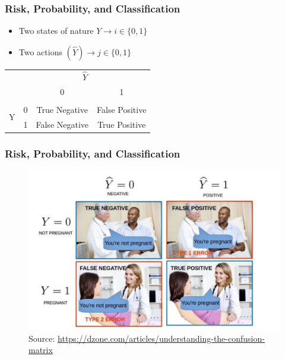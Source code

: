 \documentclass[
  shownotes,
  xcolor={svgnames},
  hyperref={colorlinks,citecolor=DarkBlue,linkcolor=andesred,urlcolor=DarkBlue}
  , aspectratio=169]{beamer}
\begin{document}
\begin{frame}[fragile]
\frametitle{Risk, Probability, and Classification}

\begin{itemize}
  \item Two states of nature $Y \rightarrow i\in\{0,1\}$
  \medskip
  \item Two actions $(\hat{Y}) \rightarrow j\in \{0,1\}$
\end{itemize}

\begin{table}[H]
\centering
\begin{tabular}{cc|cc}
& \multicolumn{3}{c}{$\hat{Y}$}\tabularnewline
&  & 0 & 1 \\[5pt]
\hline\\[5pt]
\multirow{2}{*}{Y} & 0 & True Negative & False Positive \\[10pt]
& 1 & False Negative & True Positive \\
\end{tabular}
\end{table}
\end{frame}
\begin{frame}[fragile]
\frametitle{Risk, Probability, and Classification}

        \begin{figure}[H] \centering
            \captionsetup{justification=centering}
              \includegraphics[scale=0.4]{figures/confusion_matrix}
              \\
              \tiny
              Source: \url{https://dzone.com/articles/understanding-the-confusion-matrix}
 \end{figure}

  
\end{frame}
\end{document}
